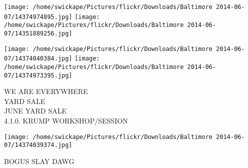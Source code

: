 \documentclass[10pt,letterpaper]{article}
\begin{document}
\texttt{[image: /home/swickape/Pictures/flickr/Downloads/Baltimore 2014-06-07/14374974895.jpg]}
\texttt{[image: /home/swickape/Pictures/flickr/Downloads/Baltimore 2014-06-07/14351889256.jpg]}

\texttt{[image: /home/swickape/Pictures/flickr/Downloads/Baltimore 2014-06-07/14374040384.jpg]}
\texttt{[image: /home/swickape/Pictures/flickr/Downloads/Baltimore 2014-06-07/14374973395.jpg]}

WE ARE EVERYWHERE\\
YARD SALE\\
JUNE YARD SALE\\
4.1.0. KRUMP WORKSHOP/SESSION\\
\pagebreak

\texttt{[image: /home/swickape/Pictures/flickr/Downloads/Baltimore 2014-06-07/14374039374.jpg]}

BOGUS SLAY DAWG\\
\pagebreak
\end{document}
